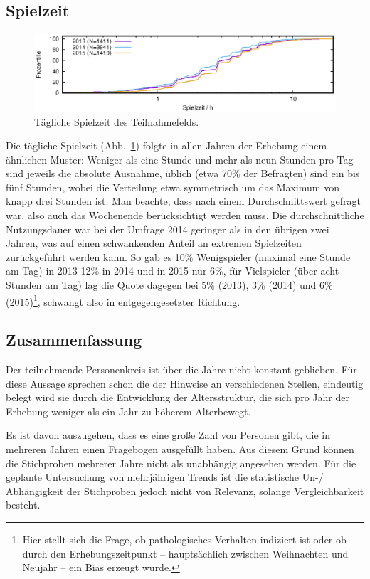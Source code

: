 \documentclass[11pt]{scrartcl}
\begin{document}
\subsection{Spielzeit}

\begin{figure}[htb]
	\centering
	\includegraphics[width=15cm]{vgl/spielzeit}
	\caption[Spielzeit]
	{Tägliche Spielzeit des Teilnahmefelds.}
	\label{fig: spielzeit}
\end{figure}

Die tägliche Spielzeit (Abb.~\ref{fig: spielzeit})
folgte in allen Jahren der Erhebung einem ähnlichen Muster:
Weniger als eine Stunde und mehr als neun Stunden pro Tag
sind jeweils die absolute Ausnahme,
üblich (etwa 70\% der Befragten) sind ein bis fünf Stunden,
wobei die Verteilung etwa symmetrisch um das Maximum von knapp drei
Stunden ist.
Man beachte, dass nach einem Durchschnittswert gefragt war,
also auch das Wochenende berücksichtigt werden muss.
Die durchschnittliche Nutzungsdauer war bei der Umfrage 2014 geringer
als in den übrigen zwei Jahren,
was auf einen schwankenden Anteil an extremen Spielzeiten
zurückgeführt werden kann.
So gab es 10\% Wenigspieler (maximal eine Stunde am Tag) in 2013
12\% in 2014 und in 2015 nur 6\%,
für Vielspieler (über acht Stunden am Tag) lag die Quote dagegen bei
5\% (2013), 3\% (2014) und 6\% (2015)\footnote{Hier stellt sich die Frage,
ob pathologisches Verhalten indiziert ist oder ob durch den Erhebungszeitpunkt
-- hauptsächlich zwischen Weihnachten und Neujahr -- ein Bias erzeugt wurde.},
schwangt also in entgegengesetzter Richtung.



\subsection{Zusammenfassung}

Der teilnehmende Personenkreis ist über die Jahre nicht konstant geblieben.
Für diese Aussage sprechen schon die der Hinweise an verschiedenen Stellen,
eindeutig belegt wird sie durch die Entwicklung der Altersstruktur,
die sich pro Jahr der Erhebung weniger als ein Jahr zu höherem Alterbewegt.

Es ist davon auszugehen, dass es eine große Zahl von Personen gibt,
die in mehreren Jahren einen Fragebogen ausgefüllt haben.
Aus diesem Grund können die Stichproben mehrerer Jahre
nicht als unabhängig angesehen werden.
Für die geplante Untersuchung von mehrjährigen Trends
ist die statistische Un-/ Abhängigkeit der Stichproben jedoch nicht von Relevanz,
solange Vergleichbarkeit besteht.




\clearpage
{}

\end{document}
